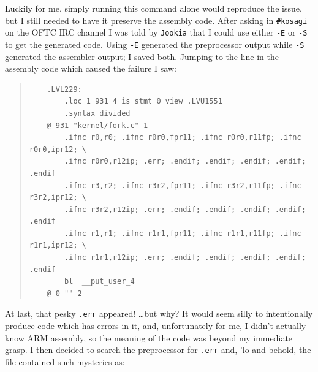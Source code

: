 \documentclass{article}
\begin{document}
Luckily for me, simply running this command alone would reproduce the issue, but I still needed to have it preserve the assembly code.  After asking in \texttt{#kosagi} on the OFTC IRC channel I was told by \texttt{Jookia} that I could use either \texttt{-E} or \texttt{-S} to get the generated code.  Using \texttt{-E} generated the preprocessor output while \texttt{-S} generated the assembler output; I saved both.  Jumping to the line in the assembly code which caused the failure I saw:

\begin{quote}
\begin{verbatim}
	.LVL229:
		.loc 1 931 4 is_stmt 0 view .LVU1551
		.syntax divided
	@ 931 "kernel/fork.c" 1
		.ifnc r0,r0; .ifnc r0r0,fpr11; .ifnc r0r0,r11fp; .ifnc r0r0,ipr12; \
		.ifnc r0r0,r12ip; .err; .endif; .endif; .endif; .endif; .endif
		.ifnc r3,r2; .ifnc r3r2,fpr11; .ifnc r3r2,r11fp; .ifnc r3r2,ipr12; \
		.ifnc r3r2,r12ip; .err; .endif; .endif; .endif; .endif; .endif
		.ifnc r1,r1; .ifnc r1r1,fpr11; .ifnc r1r1,r11fp; .ifnc r1r1,ipr12; \
		.ifnc r1r1,r12ip; .err; .endif; .endif; .endif; .endif; .endif
		bl	__put_user_4
	@ 0 "" 2
\end{verbatim}
\end{quote}

At last, that pesky \texttt{.err} appeared!  \ldots but why?  It would seem silly to intentionally produce code which has errors in it, and, unfortunately for me, I didn't actually know ARM assembly, so the meaning of the code was beyond my immediate grasp.  I then decided to search the preprocessor for \texttt{.err} and, 'lo and behold, the file contained such mysteries as:
\end{document}
